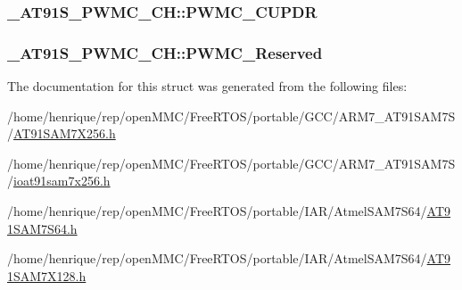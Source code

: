\hypertarget{struct__AT91S__PWMC__CH_abb4f81af917724b30274a8c08918ea32}{
\subsubsection[{P\-W\-M\-C\-\_\-\-C\-U\-P\-D\-R}]{ \-\_\-\-A\-T91\-S\-\_\-\-P\-W\-M\-C\-\_\-\-C\-H\-::\-P\-W\-M\-C\-\_\-\-C\-U\-P\-D\-R}}\label{struct__AT91S__PWMC__CH_abb4f81af917724b30274a8c08918ea32}
\hypertarget{struct__AT91S__PWMC__CH_ada98ecbec7cd83bce1e5ec85c25a463d}{
\subsubsection[{P\-W\-M\-C\-\_\-\-Reserved}]{ \-\_\-\-A\-T91\-S\-\_\-\-P\-W\-M\-C\-\_\-\-C\-H\-::\-P\-W\-M\-C\-\_\-\-Reserved}}\label{struct__AT91S__PWMC__CH_ada98ecbec7cd83bce1e5ec85c25a463d}


The documentation for this struct was generated from the following files\-:\begin{DoxyCompactItemize}
\item 
/home/henrique/rep/open\-M\-M\-C/\-Free\-R\-T\-O\-S/portable/\-G\-C\-C/\-A\-R\-M7\-\_\-\-A\-T91\-S\-A\-M7\-S/\hyperlink{GCC_2ARM7__AT91SAM7S_2AT91SAM7X256_8h}{A\-T91\-S\-A\-M7\-X256.\-h}\item 
/home/henrique/rep/open\-M\-M\-C/\-Free\-R\-T\-O\-S/portable/\-G\-C\-C/\-A\-R\-M7\-\_\-\-A\-T91\-S\-A\-M7\-S/\hyperlink{ioat91sam7x256_8h}{ioat91sam7x256.\-h}\item 
/home/henrique/rep/open\-M\-M\-C/\-Free\-R\-T\-O\-S/portable/\-I\-A\-R/\-Atmel\-S\-A\-M7\-S64/\hyperlink{AT91SAM7S64_8h}{A\-T91\-S\-A\-M7\-S64.\-h}\item 
/home/henrique/rep/open\-M\-M\-C/\-Free\-R\-T\-O\-S/portable/\-I\-A\-R/\-Atmel\-S\-A\-M7\-S64/\hyperlink{AT91SAM7X128_8h}{A\-T91\-S\-A\-M7\-X128.\-h}\end{DoxyCompactItemize}
